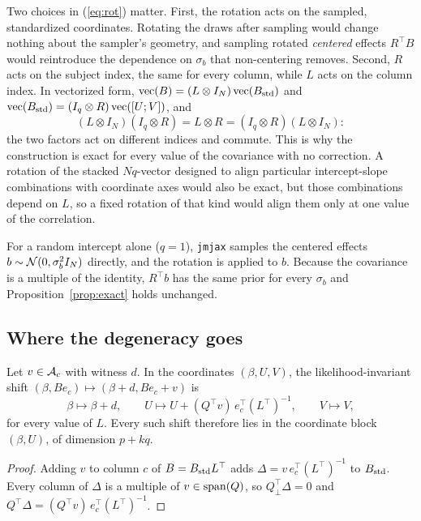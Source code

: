 Two choices in (\ref{eq:rot}) matter. First, the rotation acts on the
sampled, standardized coordinates. Rotating the draws after sampling would
change nothing about the sampler's geometry, and sampling rotated
\emph{centered} effects $R^{\top} B$ would reintroduce the dependence on
$\sigma_b$ that non-centering removes. Second, $R$ acts on the subject
index, the same for every column, while $L$ acts on the column index. In
vectorized form, $\operatorname{vec}(B) = (L \otimes I_N)
\operatorname{vec}(B_{\mathrm{std}})$ and $\operatorname{vec}(B_{\mathrm{std}}) = (I_q \otimes
R)\operatorname{vec}([U; V])$, and
\[
(L \otimes I_N)(I_q \otimes R) = L \otimes R = (I_q \otimes R)(L \otimes I_N):
\]
the two factors act on different indices and commute. This is why the
construction is exact for every value of the covariance with no
correction. A rotation of the stacked $Nq$-vector designed to align
particular intercept-slope combinations with coordinate axes would also be
exact, but those combinations depend on $L$, so a fixed rotation of that
kind would align them only at one value of the correlation.

For a random intercept alone ($q = 1$), \texttt{jmjax} samples the
centered effects $b \sim \mathcal{N}(0, \sigma_b^2 I_N)$ directly, and the rotation
is applied to $b$. Because the covariance is a multiple of the identity,
$R^{\top} b$ has the same prior for every $\sigma_b$ and
Proposition~\ref{prop:exact} holds unchanged.

\subsection{Where the degeneracy goes}

\begin{lemma}[Localization]\label{lem:local}
Let $v \in \mathcal{A}_c$ with witness $d$. In the coordinates
$(\beta, U, V)$, the likelihood-invariant shift $(\beta, B e_c) \mapsto
(\beta + d, B e_c + v)$ is
\[
\beta \mapsto \beta + d, \qquad
U \mapsto U + (Q^{\top} v)\, e_c^{\top} (L^{\top})^{-1}, \qquad
V \mapsto V,
\]
for every value of $L$. Every such shift therefore lies in the coordinate
block $(\beta, U)$, of dimension $p + kq$.
\end{lemma}

\begin{proof}
Adding $v$ to column $c$ of $B = B_{\mathrm{std}} L^{\top}$ adds $\Delta = v\,
e_c^{\top} (L^{\top})^{-1}$ to $B_{\mathrm{std}}$. Every column of $\Delta$ is a
multiple of $v \in \operatorname{span}(Q)$, so $Q_{\perp}^{\top} \Delta = 0$ and
$Q^{\top} \Delta = (Q^{\top} v)\, e_c^{\top} (L^{\top})^{-1}$.
\end{proof}

